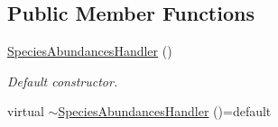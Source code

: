 \subsection*{Public Member Functions}
\begin{DoxyCompactItemize}
\item 
\hyperlink{class_species_abundances_handler_a746492dd19416111f7d1d1c79b21199c}{Species\+Abundances\+Handler} ()\hypertarget{class_species_abundances_handler_a746492dd19416111f7d1d1c79b21199c}{}\label{class_species_abundances_handler_a746492dd19416111f7d1d1c79b21199c}

\begin{DoxyCompactList}\small\item\em Default constructor. \end{DoxyCompactList}\item 
virtual \hyperlink{class_species_abundances_handler_a243315a52e5674c518563d0dfd1033eb}{$\sim$\+Species\+Abundances\+Handler} ()=default\hypertarget{class_species_abundances_handler_a243315a52e5674c518563d0dfd1033eb}{}\label{class_species_abundances_handler_a243315a52e5674c518563d0dfd1033eb}


\end{DoxyCompactItemize}
